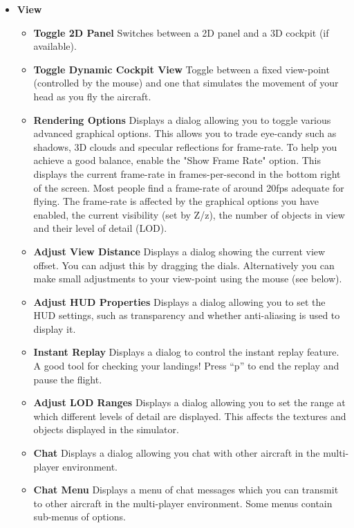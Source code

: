 \begin{itemize}
 \item \textbf{View}
 \begin{itemize}
  \item \textbf{Toggle 2D Panel}  Switches between a 2D panel and a 3D cockpit
(if available).
  \item \textbf{Toggle Dynamic Cockpit View}  Toggle between a fixed view-point
  (controlled by the mouse) and one that simulates the movement of your head as
  you fly the aircraft.  
  \item \textbf{Rendering Options} Displays a dialog allowing you to toggle
various advanced graphical options. 
  This allows you to trade eye-candy such as shadows, 3D clouds and specular
reflections for frame-rate. 
  To help you achieve a good balance, enable the "Show Frame Rate" option. 
  This displays the current frame-rate in frames-per-second in the bottom right
of the screen. 
  Most people find a frame-rate of around 20fps adequate for flying. The
frame-rate is affected by the 
  graphical options you have enabled, the current visibility (set by Z/z), the
number of objects in view 
  and their level of detail (LOD).
  \item \textbf{Adjust View Distance}  Displays a dialog showing the current
view offset. 
  You can adjust this by dragging the dials. Alternatively you can make small
adjustments 
  to your view-point using the mouse (see below).
  \item \textbf{Adjust HUD Properties}  Displays a dialog allowing you to set
the HUD settings, such as transparency and whether anti-aliasing is used to display it. 
  \item \textbf{Instant Replay} Displays a dialog to control the instant replay
feature. 
  A good tool for checking your landings! Press ``p'' to end the replay and
pause the flight.
  \item \textbf{Adjust LOD Ranges} Displays a dialog allowing you to set the
range at which different 
  levels of detail are displayed. This affects the textures and objects
displayed in the simulator. 
  \item \textbf{Chat} Displays a dialog allowing you chat with other aircraft in
the multi-player environment. 
  \item \textbf{Chat Menu} Displays a menu of chat messages which you can 
  transmit to other aircraft in the multi-player environment. Some menus
  contain sub-menus of options.
 \end{itemize}
 

\end{itemize}
